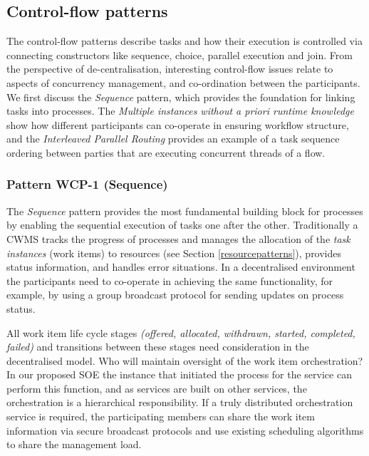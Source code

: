 \subsection{Control-flow patterns}
\label{controlflowpatterns}

The control-flow patterns describe tasks and how their execution is controlled via connecting constructors like sequence, choice, parallel execution and join. From the perspective of de-centralisation, interesting control-flow issues relate to aspects of concurrency management, and co-ordination between the participants. We first discuss the \emph{Sequence} pattern, which provides the foundation for linking tasks into processes. The \emph{Multiple instances without a priori runtime knowledge} show how different participants can co-operate in ensuring workflow structure, and the \emph{Interleaved Parallel Routing} provides an example of a task sequence ordering between parties that are executing concurrent threads of a flow.

\subsubsection{Pattern WCP-1 (Sequence)}

The \emph{Sequence} pattern provides the most fundamental building block for processes by enabling the sequential execution of tasks one after the other. Traditionally a CWMS tracks the progress of processes and manages the allocation of the \emph{task instances} (work items) to resources (see Section \ref{resourcepatterns}), provides status information, and handles error situations. In a decentralised environment the participants need to co-operate in achieving the same functionality, for example, by using a group broadcast protocol for sending updates on process status.

All work item life cycle stages \emph{(offered, allocated, withdrawn, started, completed, failed)} and transitions between these stages need consideration in the decentralised model. Who will maintain oversight of the work item orchestration? In our proposed SOE the instance that initiated the process for the service can perform this function, and as services are built on other services, the orchestration is a hierarchical responsibility. If a truly distributed orchestration service is required, the participating members can share the work item information via secure broadcast protocols and use existing scheduling algorithms to share the management load.





